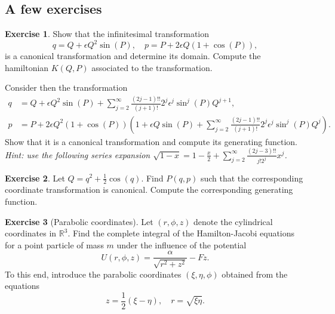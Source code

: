 \documentclass[english,fontsize=11pt,paper=b5]{scrbook}
\numberwithin{equation}{chapter}
\theoremstyle{definition}
\newtheorem{exercise}{Exercise}[chapter]
\begin{document}
    \subsection{A few exercises}
    \begin{exercise}
      Show that the infinitesimal transformation
      \begin{equation}
        q = Q + \epsilon Q^2 \sin(P), \quad
        p = P + 2\epsilon Q(1+\cos(P)),
      \end{equation}
      is a canonical transformation and determine its domain.
      Compute the hamiltonian $K(Q,P)$ associated to the transformation.

      Consider then the transformation
      \begin{align}
        q & = Q + \epsilon Q^2 \sin(P) + \sum_{j=2}^\infty \frac{(2j-1)!!}{(j+1)!}2^j \epsilon^j \sin^j(P) Q^{j+1}, \\
        p & = P + 2\epsilon Q^2\left(1+\cos(P)\right)\left(
          1 + \epsilon Q \sin(P) + \sum_{j=2}^\infty \frac{(2j-1)!!}{(j+1)!}2^j \epsilon^j \sin^j(P) Q^{j}
        \right).
        \end{align}
        Show that it is a canonical transformation and compute its generating function.\\
        \textit{Hint: use the following series expansion $\sqrt{1-x} = 1 - \frac{x}{2} + \sum_{j=2}^\infty \frac{(2j-3)!!}{j! 2^j} x^j$.}
      \end{exercise}

      \begin{exercise}
        Let $Q = q^2 + \frac12 \cos(q)$.
        Find $P(q,p)$ such that the corresponding coordinate transformation is canonical.
        Compute the corresponding generating function.
      \end{exercise}

      \begin{exercise}[Parabolic coordinates]
        Let $(r,\phi,z)$ denote the cylindrical coordinates in $\mathbb{R}^3$.
        Find the complete integral of the Hamilton-Jacobi equations for a point particle of mass $m$ under the influence of the potential
        \begin{equation}
          U(r,\phi,z) = \frac{\alpha}{\sqrt{r^2+z^2}} - F z.
        \end{equation}
        To this end, introduce the parabolic coordinates $(\xi, \eta, \phi)$ obtained from the equations
        \begin{equation}
          z = \frac 12(\xi - \eta), \quad
          r = \sqrt{\xi\eta}.
        \end{equation}
      \end{exercise}
\end{document}
